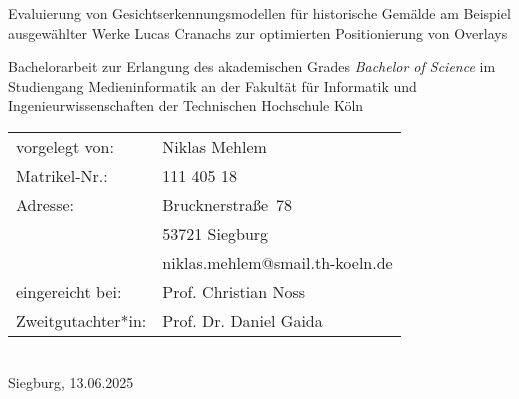 \begin{titlepage}
%
\sffamily%
%
\begin{center}
\end{center}
%
\vfill
%
\begin{huge}
Evaluierung von Gesichtserkennungsmodellen für historische Gemälde am Beispiel ausgewählter Werke Lucas Cranachs zur optimierten Positionierung von Overlays\\[10mm]
\end{huge}
%
Bachelorarbeit zur Erlangung des akademischen Grades\newline
\emph{Bachelor of Science}\newline
im Studiengang Medieninformatik\newline
an der Fakultät für Informatik und Ingenieurwissenschaften\newline
der Technischen Hochschule Köln
%
\vfill
%
\begin{tabular}{@{}ll}
vorgelegt von: & Niklas Mehlem\\
Matrikel-Nr.:  & 111 405 18\\
Adresse:       & Brucknerstraße~78\\
               & 53721 Siegburg\\
               & niklas.mehlem@smail.th-koeln.de\\[5mm]
eingereicht bei:   & Prof. Christian Noss\\
Zweitgutachter*in: & Prof. Dr. Daniel Gaida
\end{tabular}	
%
\\[10mm]
%
Siegburg, 13.06.2025%
%
\rmfamily%
%
\end{titlepage}